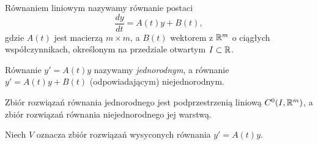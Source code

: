 
\begin{definition}
  Równaniem liniowym nazywamy równanie postaci
  \[
    \frac{dy}{dt} = A(t)y + B(t),
  \]
  gdzie $A(t)$ jest macierzą $m \times m$, a $B(t)$ wektorem z $\mathbb{R}^m$ o ciągłych współczynnikach,
  określonym na przedziale otwartym $I \subset \mathbb{R}$.
\end{definition}

\begin{definition}
  Równanie $y' = A(t)y$ nazywamy \emph{jednorodnym}, a równanie $y' = A(t)y + B(t)$ (odpowiadającym)
  niejednorodnym.
\end{definition}

\begin{theorem}
  Zbiór rozwiązań równania jednorodnego jest podprzestrzenią liniową $C^0(I,\mathbb{R}^m)$, a zbiór rozwiązań
  równania niejednorodnego jej warstwą.
\end{theorem}

\noindent Niech $V$ oznacza zbiór rozwiązań wysyconych równania $y' = A(t)y$.

